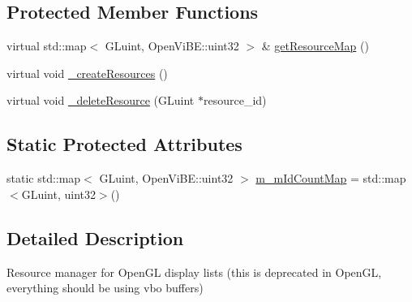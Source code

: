 \subsection*{Protected Member Functions}
\begin{DoxyCompactItemize}
\item 
virtual std::map$<$ GLuint, OpenViBE::uint32 $>$ \& \hyperlink{classOpenViBEApplications_1_1OpenGLDListManager_a04d7e58a00105181e915bd39b25da69f}{getResourceMap} ()
\item 
virtual void \hyperlink{classOpenViBEApplications_1_1OpenGLDListManager_a4e870e49756a5b1d49b35a696993e179}{\_\-createResources} ()
\item 
virtual void \hyperlink{classOpenViBEApplications_1_1OpenGLDListManager_a7b3c8ef96b13d1b89ec7ccaecd1cbdea}{\_\-deleteResource} (GLuint $\ast$resource\_\-id)
\end{DoxyCompactItemize}
\subsection*{Static Protected Attributes}
\begin{DoxyCompactItemize}
\item 
static std::map$<$ GLuint, OpenViBE::uint32 $>$ \hyperlink{classOpenViBEApplications_1_1OpenGLDListManager_a31268e40c062e0b0b5f5632a79a685b4}{m\_\-mIdCountMap} = std::map$<$GLuint, uint32$>$()
\end{DoxyCompactItemize}


\subsection{Detailed Description}
Resource manager for OpenGL display lists (this is deprecated in OpenGL, everything should be using vbo buffers) 

